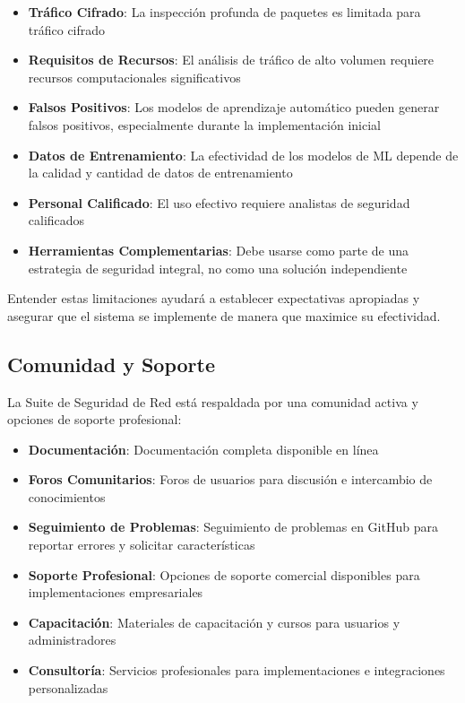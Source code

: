 \begin{itemize}
    \item \textbf{Tráfico Cifrado}: La inspección profunda de paquetes es limitada para tráfico cifrado
    \item \textbf{Requisitos de Recursos}: El análisis de tráfico de alto volumen requiere recursos computacionales significativos
    \item \textbf{Falsos Positivos}: Los modelos de aprendizaje automático pueden generar falsos positivos, especialmente durante la implementación inicial
    \item \textbf{Datos de Entrenamiento}: La efectividad de los modelos de ML depende de la calidad y cantidad de datos de entrenamiento
    \item \textbf{Personal Calificado}: El uso efectivo requiere analistas de seguridad calificados
    \item \textbf{Herramientas Complementarias}: Debe usarse como parte de una estrategia de seguridad integral, no como una solución independiente
\end{itemize}

Entender estas limitaciones ayudará a establecer expectativas apropiadas y asegurar que el sistema se implemente de manera que maximice su efectividad.

\subsection{Comunidad y Soporte}
La Suite de Seguridad de Red está respaldada por una comunidad activa y opciones de soporte profesional:

\begin{itemize}
    \item \textbf{Documentación}: Documentación completa disponible en línea
    \item \textbf{Foros Comunitarios}: Foros de usuarios para discusión e intercambio de conocimientos
    \item \textbf{Seguimiento de Problemas}: Seguimiento de problemas en GitHub para reportar errores y solicitar características
    \item \textbf{Soporte Profesional}: Opciones de soporte comercial disponibles para implementaciones empresariales
    \item \textbf{Capacitación}: Materiales de capacitación y cursos para usuarios y administradores
    \item \textbf{Consultoría}: Servicios profesionales para implementaciones e integraciones personalizadas
\end{itemize}

